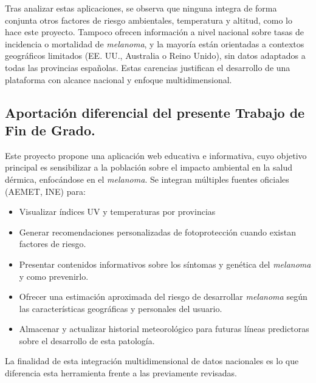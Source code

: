 Tras analizar estas aplicaciones, se observa que ninguna integra de forma conjunta otros factores de riesgo ambientales, temperatura y altitud, como lo hace este proyecto. Tampoco ofrecen información a nivel nacional sobre tasas de incidencia o mortalidad de \textit{melanoma}, y la mayoría están orientadas a contextos geográficos limitados (EE. UU., Australia o Reino Unido), sin datos adaptados a todas las provincias españolas. Estas carencias justifican el desarrollo de una plataforma con alcance nacional y enfoque multidimensional.


\subsection{Aportación diferencial del presente Trabajo de Fin de Grado.}
Este proyecto propone una aplicación web educativa e informativa, cuyo objetivo principal es sensibilizar a la población sobre el impacto ambiental en la salud dérmica, enfocándose en el \textit{melanoma}. 
Se integran múltiples fuentes oficiales (AEMET, INE) para:
\begin{itemize}
    \item Visualizar índices UV y temperaturas por provincias
    \item Generar recomendaciones personalizadas de fotoprotección cuando existan factores de riesgo.
    \item Presentar contenidos informativos sobre los síntomas y genética del \textit{melanoma} y como prevenirlo.
    \item Ofrecer una estimación aproximada del riesgo de desarrollar \textit{melanoma} según las características geográficas y personales del usuario.
    \item Almacenar y actualizar historial meteorológico para futuras líneas predictoras sobre el desarrollo de esta patología. 
\end{itemize}

La finalidad de esta integración multidimensional de datos nacionales es lo que diferencia esta herramienta frente a las previamente revisadas.

